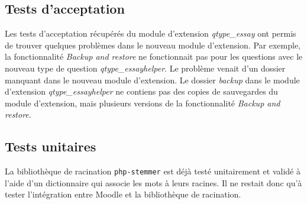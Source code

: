 \subsection{Tests d'acceptation} \label{dev_test_acceptation}
Les tests d'acceptation r\'ecup\'er\'es du module d'extension \textit{qtype\_essay} ont permis de trouver quelques probl\`emes  dans le nouveau module d'extension.
Par exemple, la fonctionnalit\'e \textit{Backup and restore} ne fonctionnait pas pour les questions avec le nouveau type de question \textit{qtype\_essayhelper}.
Le probl\`eme venait d'un dossier manquant dans le nouveau module d'extension.
Le dossier \textit{backup} dans le module d'extension \textit{qtype\_essayhelper} ne contiens pas des copies de sauvegardes du module d'extension, mais plusieurs versions de la fonctionnalit\'e \textit{Backup and restore}.
\subsection{Tests unitaires} \label{dev_test_unitaire}
La biblioth\`eque de racination \texttt{php-stemmer} est d\'ej\`a test\'e unitairement et valid\'e \`a l'aide d'un dictionnaire qui associe les mots \`a leurs racines.
Il ne restait donc qu'\`a tester l'int\'egration entre Moodle et la biblioth\`eque de racination.